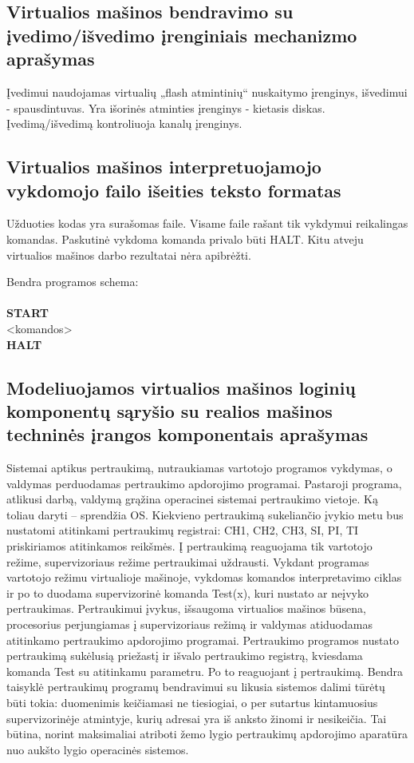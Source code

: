 \subsection{Virtualios mašinos bendravimo su įvedimo/išvedimo įrenginiais
mechanizmo aprašymas}

Įvedimui naudojamas virtualių „flash atmintinių“ nuskaitymo įrenginys, išvedimui - spausdintuvas. Yra išorinės atminties įrenginys - kietasis diskas. Įvedimą/išvedimą kontroliuoja kanalų įrenginys.

\subsection{Virtualios mašinos interpretuojamojo vykdomojo failo išeities 
teksto formatas}

Užduoties kodas yra surašomas faile. Visame faile rašant tik vykdymui reikalingas
komandas. Paskutinė vykdoma komanda privalo būti HALT. Kitu atveju virtualios mašinos darbo
rezultatai nėra apibrėžti.

Bendra programos schema:\\
\\\textbf{START}\\
<komandos>\\
\textbf{HALT}

\subsection{Modeliuojamos virtualios mašinos loginių komponentų sąryšio su 
realios mašinos techninės įrangos komponentais aprašymas}

Sistemai aptikus pertraukimą, nutraukiamas vartotojo programos vykdymas, o valdymas perduodamas pertraukimo apdorojimo programai. Pastaroji programa, atlikusi darbą, valdymą grąžina operacinei sistemai pertraukimo vietoje.  Ką toliau daryti – sprendžia OS. Kiekvieno pertraukimą sukeliančio įvykio metu bus nustatomi atitinkami pertraukimų registrai: CH1, CH2, CH3, SI, PI, TI priskiriamos atitinkamos reikšmės. 
Į pertraukimą reaguojama tik vartotojo režime, supervizoriaus režime pertraukimai uždrausti. Vykdant programas vartotojo režimu virtualioje mašinoje, vykdomas komandos interpretavimo ciklas ir po to duodama supervizorinė komanda Test(x), kuri  nustato ar neįvyko pertraukimas. 
Pertraukimui įvykus, išsaugoma virtualios mašinos būsena, procesorius perjungiamas į supervizoriaus režimą ir valdymas atiduodamas atitinkamo pertraukimo apdorojimo programai.
Pertraukimo programos nustato pertraukimą sukėlusią priežastį ir išvalo pertraukimo registrą, kviesdama komanda Test su atitinkamu parametru. Po  to reaguojant į pertraukimą.
Bendra taisyklė pertraukimų programų bendravimui su likusia sistemos dalimi tūrėtų būti tokia: duomenimis keičiamasi ne tiesiogiai, o per sutartus kintamuosius supervizorinėje atmintyje, kurių adresai yra iš anksto žinomi ir nesikeičia. Tai būtina, norint maksimaliai atriboti žemo lygio pertraukimų apdorojimo aparatūra nuo aukšto lygio operacinės sistemos.
   

